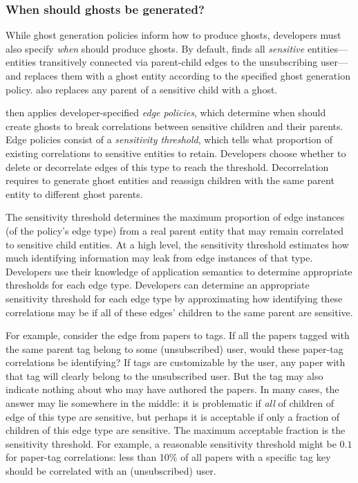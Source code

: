 \subsubsection{When should ghosts be generated?}
\label{design:edgepol}
While ghost generation policies inform \sys how to produce ghosts, developers must also specify
\emph{when} \sys should produce ghosts. 
By default, \sys finds all \emph{sensitive} entities---entities transitively connected via
parent-child edges to the unsubscribing user---and
replaces them with a ghost entity according to the specified ghost generation policy. \sys also
replaces any parent of a sensitive child with a ghost.

\sys then applies developer-specified \emph{edge policies}, which determine when \sys should
create ghosts to break correlations between sensitive children and their parents.
Edge policies consist of a \emph{sensitivity threshold}, which tells \sys what
proportion of existing correlations to sensitive entities to retain. Developers choose
whether to delete or decorrelate edges of this type to reach the threshold. Decorrelation requires
\sys to generate ghost entities and reassign children with the same parent entity to different
ghost parents.

%
The sensitivity threshold determines the maximum proportion of edge instances (of the policy's edge
type) from a real parent entity that may remain correlated to sensitive child entities.
At a high level, the sensitivity threshold estimates how much identifying information may leak from
edge instances of that type.  Developers use their knowledge of application semantics to determine
appropriate thresholds for each edge type.  Developers can determine an appropriate sensitivity
threshold for each edge type by approximating how identifying these correlations may be if
all of these edges' children to the same parent are sensitive.

For example, consider the edge from papers to tags. If all the papers tagged with the same parent
tag belong to some (unsubscribed) user, would these paper-tag correlations be identifying? If tags
are customizable by the user, any paper with that tag will clearly belong to the unsubscribed user.
But the tag may also indicate nothing about who may have authored the papers.  In many cases, the
answer may lie somewhere in the middle: it is problematic if \emph{all} of children of edge of this
type are sensitive, but perhaps it is acceptable if only a fraction of children of this edge type
are sensitive. The maximum acceptable fraction is the sensitivity threshold. For example, a
reasonable sensitivity threshold might be $0.1$ for paper-tag correlations: less than 10\% of
all papers with a specific tag key should be correlated with an (unsubscribed) user. 

